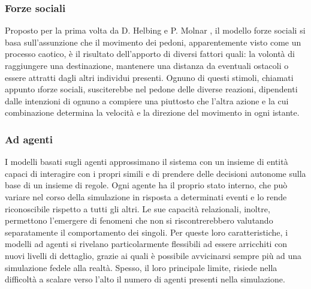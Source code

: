 \subsubsection{Forze sociali}
Proposto per la prima volta da D. Helbing e P. Molnar \cite{Helbing1995}, il modello forze sociali si basa sull'assunzione che il movimento dei pedoni, apparentemente visto come un processo caotico, è il risultato dell'apporto di diversi fattori quali: la volontà di raggiungere una destinazione, mantenere una distanza da eventuali ostacoli o essere attratti dagli altri individui presenti. \newline 
Ognuno di questi stimoli, chiamati appunto \i{forze sociali}, susciterebbe nel pedone delle diverse reazioni, dipendenti dalle intenzioni di ognuno a compiere una piuttosto che l'altra azione e la cui combinazione determina la velocità e la direzione del movimento in ogni istante.

\subsubsection{Ad agenti}
I modelli basati sugli agenti approssimano il sistema con un insieme di entità capaci di interagire con i propri simili e di prendere delle decisioni autonome sulla base di un insieme di regole. \newline
Ogni agente ha il proprio stato interno, che può variare nel corso della simulazione in risposta a determinati eventi e lo rende riconoscibile rispetto a tutti gli altri. Le sue capacità relazionali, inoltre, permettono l'emergere di fenomeni che non si riscontrerebbero valutando separatamente il comportamento dei singoli. \newline 
Per queste loro caratteristiche, i modelli ad agenti si rivelano particolarmente flessibili ad essere arricchiti con nuovi livelli di dettaglio, grazie ai quali è possibile avvicinarsi sempre più ad una simulazione fedele alla realtà. \newline
Spesso, il loro principale limite, risiede nella difficoltà a scalare verso l'alto il numero di agenti presenti nella simulazione.

